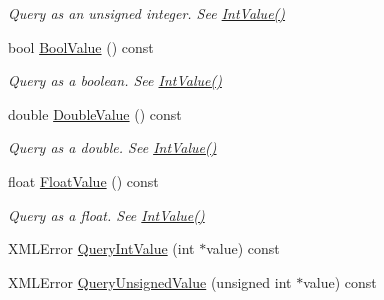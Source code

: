 \begin{DoxyCompactItemize}
\begin{DoxyCompactList}\small\item\em Query as an unsigned integer. See \hyperlink{classtinyxml2_1_1_x_m_l_attribute_a949d02a5888092cc68c1e29185301863}{Int\+Value()} \end{DoxyCompactList}\item 
bool \hyperlink{classtinyxml2_1_1_x_m_l_attribute_afb444b7a12527f836aa161b54b2f7ce7}{Bool\+Value} () const \hypertarget{classtinyxml2_1_1_x_m_l_attribute_afb444b7a12527f836aa161b54b2f7ce7}{}\label{classtinyxml2_1_1_x_m_l_attribute_afb444b7a12527f836aa161b54b2f7ce7}

\begin{DoxyCompactList}\small\item\em Query as a boolean. See \hyperlink{classtinyxml2_1_1_x_m_l_attribute_a949d02a5888092cc68c1e29185301863}{Int\+Value()} \end{DoxyCompactList}\item 
double \hyperlink{classtinyxml2_1_1_x_m_l_attribute_a336153e5aa1b7ccd6502fc249bfb3fd7}{Double\+Value} () const \hypertarget{classtinyxml2_1_1_x_m_l_attribute_a336153e5aa1b7ccd6502fc249bfb3fd7}{}\label{classtinyxml2_1_1_x_m_l_attribute_a336153e5aa1b7ccd6502fc249bfb3fd7}

\begin{DoxyCompactList}\small\item\em Query as a double. See \hyperlink{classtinyxml2_1_1_x_m_l_attribute_a949d02a5888092cc68c1e29185301863}{Int\+Value()} \end{DoxyCompactList}\item 
float \hyperlink{classtinyxml2_1_1_x_m_l_attribute_ae3d51ff98eacc1dc46efcfdaee5c84ad}{Float\+Value} () const \hypertarget{classtinyxml2_1_1_x_m_l_attribute_ae3d51ff98eacc1dc46efcfdaee5c84ad}{}\label{classtinyxml2_1_1_x_m_l_attribute_ae3d51ff98eacc1dc46efcfdaee5c84ad}

\begin{DoxyCompactList}\small\item\em Query as a float. See \hyperlink{classtinyxml2_1_1_x_m_l_attribute_a949d02a5888092cc68c1e29185301863}{Int\+Value()} \end{DoxyCompactList}\item 
X\+M\+L\+Error \hyperlink{classtinyxml2_1_1_x_m_l_attribute_ad510a83c4ff2755844bb250b125d28ff}{Query\+Int\+Value} (int $\ast$value) const 
\item 
X\+M\+L\+Error \hyperlink{classtinyxml2_1_1_x_m_l_attribute_ac93f5981adfd62ac4ea76bfa668ee2b4}{Query\+Unsigned\+Value} (unsigned int $\ast$value) const \hypertarget{classtinyxml2_1_1_x_m_l_attribute_ac93f5981adfd62ac4ea76bfa668ee2b4}{}\label{classtinyxml2_1_1_x_m_l_attribute_ac93f5981adfd62ac4ea76bfa668ee2b4}


\end{DoxyCompactItemize}
